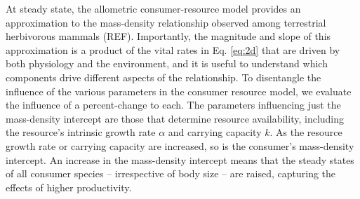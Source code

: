 \documentclass[11pt]{article}
\begin{document}


At steady state, the allometric consumer-resource model provides an approximation to the mass-density relationship observed among terrestrial herbivorous mammals (REF). 
Importantly, the magnitude and slope of this approximation is a product of the vital rates in Eq. \ref{eq:2d} that are driven by both physiology and the environment, and it is useful to understand which components drive different aspects of the relationship.
To disentangle the influence of the various parameters in the consumer resource model, we evaluate the influence of a percent-change to each.
The parameters influencing just the mass-density intercept are those that determine resource availability, including the resource's intrinsic growth rate $\alpha$ and carrying capacity $k$.
As the resource growth rate or carrying capacity are increased, so is the consumer's mass-density intercept.
An increase in the mass-density intercept means that the steady states of all consumer species -- irrespective of body size -- are raised, capturing the effects of higher productivity.
\end{document}
